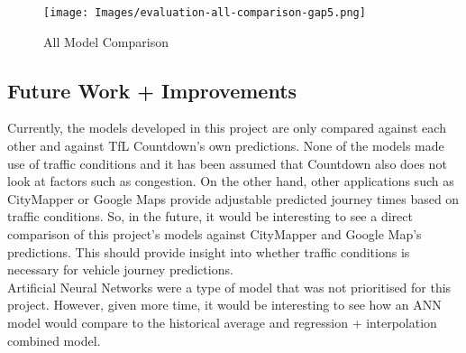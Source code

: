 \begin{figure}[H]
\begin{center}
    \texttt{[image: Images/evaluation-all-comparison-gap5.png]}
    \caption{All Model Comparison}
    \label{fig:all-model-comparison}
\end{center}
\end{figure}

\subsection{Future Work + Improvements}

Currently, the models developed in this project are only compared against each other and against TfL Countdown's own predictions. None of the models made use of traffic conditions and it has been assumed that Countdown also does not look at factors such as congestion. On the other hand, other applications such as CityMapper or Google Maps provide adjustable predicted journey times based on traffic conditions. So, in the future, it would be interesting to see a direct comparison of this project's models against CityMapper and Google Map's predictions. This should provide insight into whether traffic conditions is necessary for vehicle journey predictions. \\

Artificial Neural Networks were a type of model that was not prioritised for this project. However, given more time, it would be interesting to see how an ANN model would compare to the historical average and regression + interpolation combined model. \\

\clearpage